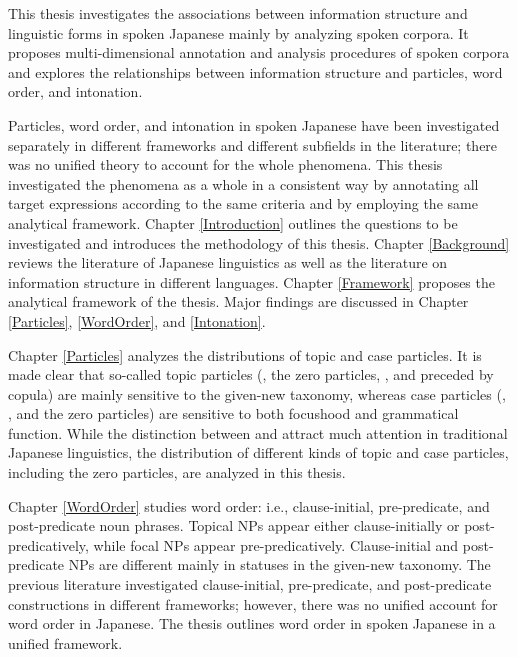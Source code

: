\label{Abstract}
\begin{refsection}

This thesis investigates the associations between information structure
and linguistic forms in spoken Japanese
mainly by analyzing spoken corpora.
It proposes multi-dimensional annotation and analysis procedures of spoken corpora and
explores the relationships between information structure
and particles, word order, and intonation.

Particles, word order, and intonation in spoken Japanese have been investigated separately in different frameworks and different subfields in the literature;
there was no unified theory to account for the whole phenomena.
This thesis investigated the phenomena as a whole in a consistent way
by annotating all target expressions according to the same criteria and
by employing the same analytical framework.
Chapter \ref{Introduction} outlines the questions to be investigated and introduces the methodology of this thesis.
Chapter \ref{Background} reviews the literature of Japanese linguistics
as well as the literature on information structure in different languages.
Chapter \ref{Framework} proposes the analytical framework of the thesis.
Major findings are discussed in Chapter \ref{Particles}, \ref{WordOrder}, and \ref{Intonation}.

Chapter \ref{Particles} analyzes the distributions of topic and case particles.
It is made clear that so-called topic particles 
(, the zero particles, , and  preceded by copula) are mainly sensitive to the given-new taxonomy,
whereas case particles (, , and the zero particles) are sensitive to both focushood and grammatical function.
While the distinction between  and  attract much attention in traditional Japanese linguistics,
the distribution of different kinds of topic and case particles, including the zero particles,
are analyzed in this thesis.

Chapter \ref{WordOrder} studies word order:
i.e., clause-initial, pre-predicate, and post-pred\-i\-cate noun phrases.%
Topical NPs appear either clause-initially or post-pred\-i\-cat\-ively,
while focal NPs appear pre-predicatively.
Clause-initial and post-predicate NPs are different mainly in statuses in the given-new taxonomy.
The previous literature investigated clause-initial, pre-predicate, and post-predicate constructions in different frameworks;
however, there was no unified account for word order in Japanese.
The thesis outlines word order in spoken Japanese in a unified framework.


\end{refsection}
